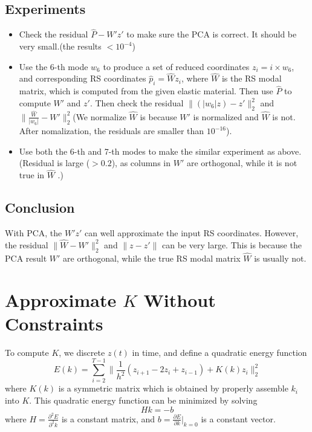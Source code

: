\documentclass[twocolumn,a4paper]{article}
\begin{document}
\subsection{Experiments}
\begin{itemize}
\item Check the residual $\hat{P}-W'z'$ to make sure the PCA is correct. It
  should be very small.({\color{red}the results $<10^{-4}$})
\item Use the 6-th mode $w_6$ to produce a set of reduced coordinates
  $z_i=i\times w_6$, and corresponding RS coordinates $\hat{p}_i=\hat{W}z_i$,
  where $\hat{W}$ is the RS modal matrix, which is computed from the given
  elastic material. Then use $\hat{P}$ to compute $W'$ and $z'$. Then check the
  residual $\|(|w_6|z)-z'\|_2^2$ and
  $\|\frac{\hat{W}}{|w_6|}-W'\|_2^2$({\color{red}We normalize $\hat{W}$ is
    because $W'$ is normalized and $\hat{W}$ is not. After nomalization, the
    residuals are smaller than $10^{-16}$}).
\item Use both the 6-th and 7-th modes to make the similar experiment as
  above.({\color{red}Residual is large ($>0.2$), as columns in $W'$ are
    orthogonal, while it is not true in $\hat{W}$ .})
\end{itemize}

\subsection{Conclusion}
With PCA, the $W'z'$ can well approximate the input RS coordinates. However, the
residual $\|\hat{W}-W'\|_2^2$ and $\|z-z'\|$ can be very large. This is because
the PCA result $W'$ are orthogonal, while the true RS modal matrix $\hat{W}$ is
usually not.

\section{Approximate $K$ Without Constraints}
To compute $K$, we discrete $z(t)$ in time, and define a quadratic energy
function
\begin{equation} \label{qua-en}
  E(k) = \sum_{i=2}^{T-1} \|\frac{1}{h^2}(z_{i+1}-2z_{i}+z_{i-1}) + K(k)z_i\|_2^2
\end{equation}
where $K(k)$ is a symmetric matrix which is obtained by properly assemble $k_i$
into $K$. This quadratic energy function can be minimized by solving
\begin{equation} \label{sol}
  Hk = -b
\end{equation}
where $H = \frac{\partial^2{E}}{\partial^2{k}}$ is a constant matrix, and $b =
\frac{\partial{E}}{\partial{k}}|_{k=0}$ is a constant vector. 
\end{document}
